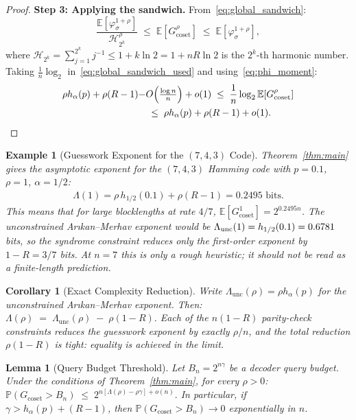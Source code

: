 \documentclass[journal,10pt,onecolumn]{IEEEtran}
\newtheorem{lemma}{Lemma}
\newtheorem{corollary}{Corollary}
\newtheorem{example}{Example}
\newcommand{\Eb}{\mathbb{E}}
\newcommand{\Pb}{\mathbb{P}}
\newcommand{\Harm}{\mathcal{H}}
\begin{document}
\begin{proof}
 
\noindent\textbf{Step 3: Applying the sandwich.}
From~\eqref{eq:global_sandwich}:
\begin{equation}
    \frac{\Eb[\varphi_\sigma^{1+\rho}]}{\Harm_{2^k}^\rho}
    \;\le\;
    \Eb\!\left[G_{\mathrm{coset}}^\rho\right]
    \;\le\;
    \Eb\!\left[\varphi_\sigma^{1+\rho}\right],
    \label{eq:global_sandwich_used}
\end{equation}
where $\Harm_{2^k}=\sum_{j=1}^{2^k}j^{-1}\le 1+k\ln 2=1+nR\ln 2$
is the $2^k$-th harmonic number.
Taking $\frac{1}{n}\log_2$ in~\eqref{eq:global_sandwich_used}
and using~\eqref{eq:phi_moment}:
\begin{align}
    \rho h_\alpha(p)+\rho(R-1)- & O\!\left(\tfrac{\log n}{n}\right)+o(1)
    \;\le\;
    \frac{1}{n}\log_2\Eb[G_{\rm coset}^\rho]
    \notag\\
    &\;\le\;
    \rho h_\alpha(p)+\rho(R-1)+o(1).
    \label{eq:final_sandwich}
\end{align}
\end{proof}

\begin{example}[Guesswork Exponent for the $(7,4,3)$ Code]
\label{ex:hamming_main}
Theorem~\ref{thm:main} gives the asymptotic exponent for the
$(7,4,3)$ Hamming code with $p=0.1$, $\rho=1$, $\alpha=1/2$:
\begin{align*}
\Lambda(1)
=\rho\,h_{1/2}(0.1)+\rho(R-1)
 = 0.2495\text{ bits}.
\end{align*}
This means that for large blocklengths at rate $4/7$,
$\Eb[G_{\mathrm{coset}}^1] =  2^{0.2495n}$.
The unconstrained Ar{\i}kan--Merhav exponent would be
$\Lambda_{\rm unc}(1)=h_{1/2}(0.1) = 0.6781$ bits, so the syndrome
constraint reduces only the \emph{first-order exponent} by $1-R=3/7$ bits.
At $n=7$ this is only a rough heuristic; it should not be read as a
finite-length prediction.
\end{example}

\begin{corollary}[Exact Complexity Reduction]
\label{cor:reduction}
Write $\Lambda_{\mathrm{unc}}(\rho)=\rho h_\alpha(p)$ for the
unconstrained Ar{\i}kan--Merhav exponent.  Then:
\(
    \Lambda(\rho)
    \;=\;
    \Lambda_{\mathrm{unc}}(\rho)\;-\;\rho(1-R).
\)
Each of the $n(1-R)$ parity-check constraints reduces the guesswork
exponent by exactly $\rho/n$, and the total reduction $\rho(1-R)$
is tight: equality is achieved in the limit.
\end{corollary}


\begin{lemma}[Query Budget Threshold]
\label{cor:budget}
Let $B_n=2^{n\gamma}$ be a decoder query budget.
Under the conditions of Theorem~\ref{thm:main}, for every $\rho>0$:
\(
    \Pb\!\left(G_{\mathrm{coset}}>B_n\right)
    \;\le\;
    2^{n[\Lambda(\rho)-\rho\gamma]+o(n)}.
\)
In particular, if $\gamma>h_\alpha(p)+(R-1)$, then
$\Pb(G_{\mathrm{coset}}>B_n)\to 0$ exponentially in $n$.
\end{lemma}
\end{document}
